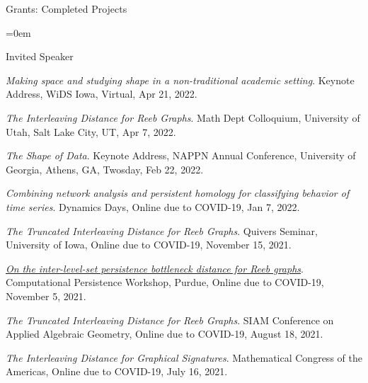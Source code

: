 \documentclass{resume} %
\begin{document}
\begin{rSection}{Grants: Completed Projects}
\begin{itemize}{}{\leftmargin=0em}

\end{itemize}
\vspace{-.1in}

\end{rSection}


%
\begin{rSection}{Invited Speaker}

\begin{etaremune}
\item\emph{Making space and studying shape in a non-traditional academic setting}. Keynote Address, WiDS Iowa, Virtual, Apr 21, 2022. 

\item\emph{The Interleaving Distance for Reeb Graphs}. Math Dept Colloquium, University of Utah, Salt Lake City, UT, Apr 7, 2022. 

\item\emph{The Shape of Data}. Keynote Address, NAPPN Annual Conference, University of Georgia, Athens, GA, Twosday, Feb 22, 2022. 

\item\emph{Combining network analysis and persistent homology for classifying behavior of time series}. Dynamics Days, Online due to COVID-19, Jan 7, 2022. 

\item\emph{The Truncated Interleaving Distance for Reeb Graphs}. Quivers Seminar, University of Iowa, Online due to COVID-19, November 15, 2021. 

\item\emph{\href{https://drive.google.com/file/d/1lnZ_g1aQBkX4W6F9SRovgQ8Bzih1Is97/view?usp=sharing}{On the inter-level-set persistence bottleneck distance for Reeb graphs}}. Computational Persistence Workshop, Purdue, Online due to COVID-19, November 5, 2021. 

\item\emph{The Truncated Interleaving Distance for Reeb Graphs}. SIAM Conference on Applied Algebraic Geometry, Online due to COVID-19, August 18, 2021. 

\item\emph{The Interleaving Distance for Graphical Signatures}. Mathematical Congress of the Americas, Online due to COVID-19, July 16, 2021. 


\end{etaremune}
\end{rSection}
\end{document}
